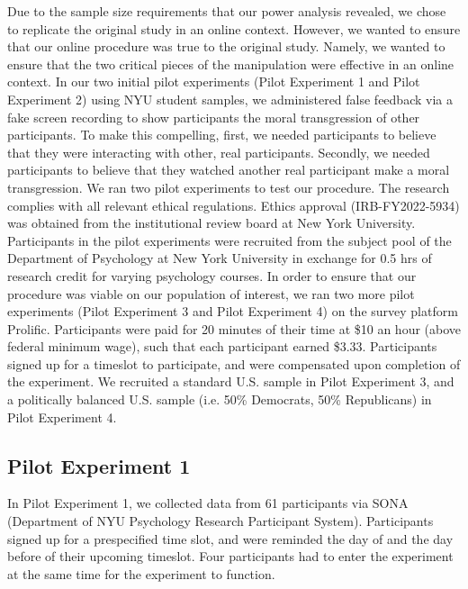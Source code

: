 \documentclass[12pt,]{article}
\begin{document}
Due to the sample size requirements that our power analysis revealed, we chose to replicate the original study in an online context. However, we wanted to ensure that our online procedure was true to the original study. Namely, we wanted to ensure that the two critical pieces of the manipulation were effective in an online context. In our two initial pilot experiments (Pilot Experiment 1 and Pilot Experiment 2) using NYU student samples, we administered false feedback via a fake screen recording to show participants the moral transgression of other participants. To make this compelling, first, we needed participants to believe that they were interacting with other, real participants. Secondly, we needed participants to believe that they watched another real participant make a moral transgression.  We ran two pilot experiments to test our procedure. The research complies with all relevant ethical regulations. Ethics approval (IRB-FY2022-5934) was obtained from the institutional review board at New York University. Participants in the pilot experiments were recruited from the subject pool of the Department of Psychology at New York University in exchange for 0.5 hrs of research credit for varying psychology courses. In order to ensure that our procedure was viable on our population of interest, we ran two more pilot experiments (Pilot Experiment 3 and Pilot Experiment 4) on the survey platform Prolific. Participants were paid for 20 minutes of their time at \$10 an hour (above federal minimum wage), such that each participant earned \$3.33. Participants signed up for a timeslot to participate, and were compensated upon completion of the experiment. We recruited a standard U.S. sample in Pilot Experiment 3, and a politically balanced U.S. sample (i.e. 50\% Democrats, 50\% Republicans) in Pilot Experiment 4.


 \subsection{Pilot Experiment 1}
\label{appendix:px1}

In Pilot Experiment 1, we collected data from 61 participants via SONA (Department of NYU Psychology Research Participant System). Participants signed up for a prespecified time slot, and were reminded the day of and the day before of their upcoming timeslot. Four participants had to enter the experiment at the same time for the experiment to function.
\end{document}
